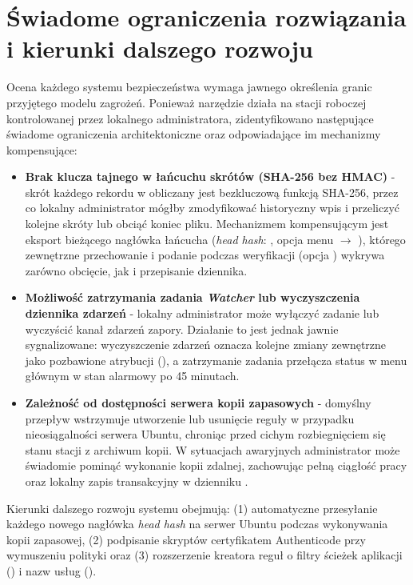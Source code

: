 \section{Świadome ograniczenia rozwiązania i kierunki dalszego rozwoju}\label{sec:dalsze-prace}

Ocena każdego systemu bezpieczeństwa wymaga jawnego określenia granic przyjętego modelu zagrożeń. Ponieważ narzędzie działa na stacji roboczej kontrolowanej przez lokalnego administratora, zidentyfikowano następujące świadome ograniczenia architektoniczne oraz odpowiadające im mechanizmy kompensujące:

\begin{itemize}
    \item \textbf{Brak klucza tajnego w łańcuchu skrótów (SHA-256 bez HMAC)} - skrót każdego rekordu w  obliczany jest bezkluczową funkcją SHA-256, przez co lokalny administrator mógłby zmodyfikować historyczny wpis i przeliczyć kolejne skróty lub obciąć koniec pliku. Mechanizmem kompensującym jest eksport bieżącego nagłówka łańcucha (\textit{head hash}: , opcja menu  $\rightarrow$ \code{[H]}), którego zewnętrzne przechowanie i podanie podczas weryfikacji (opcja ) wykrywa zarówno obcięcie, jak i przepisanie dziennika.
    \item \textbf{Możliwość zatrzymania zadania \textit{Watcher} lub wyczyszczenia dziennika zdarzeń} - lokalny administrator może wyłączyć zadanie \code{\FirewallAudit\Watcher} lub wyczyścić kanał zdarzeń zapory. Działanie to jest jednak jawnie sygnalizowane: wyczyszczenie zdarzeń oznacza kolejne zmiany zewnętrzne jako pozbawione atrybucji (), a zatrzymanie zadania przełącza status w menu głównym w stan alarmowy  po 45 minutach.
    \item \textbf{Zależność od dostępności serwera kopii zapasowych} - domyślny przepływ wstrzymuje utworzenie lub usunięcie reguły w przypadku nieosiągalności serwera Ubuntu, chroniąc przed cichym rozbiegnięciem się stanu stacji z archiwum kopii. W sytuacjach awaryjnych administrator może świadomie pominąć wykonanie kopii zdalnej, zachowując pełną ciągłość pracy oraz lokalny zapis transakcyjny w dzienniku .
\end{itemize}

Kierunki dalszego rozwoju systemu obejmują: (1) automatyczne przesyłanie każdego nowego nagłówka \textit{head hash} na serwer Ubuntu podczas wykonywania kopii zapasowej, (2) podpisanie skryptów certyfikatem Authenticode przy wymuszeniu polityki  oraz (3) rozszerzenie kreatora reguł o filtry ścieżek aplikacji () i nazw usług ().

